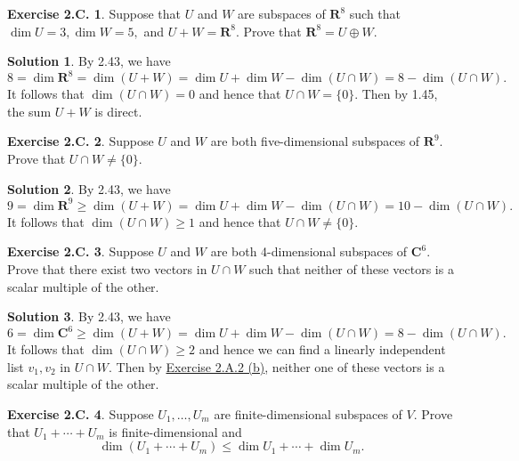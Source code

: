 \documentclass[12pt]{article}
\theoremstyle{definition}
\theoremstyle{exercise}
\newtheorem{exercise}{Exercise 2.C.}
\theoremstyle{solution}
\newtheorem*{solution}{Solution}
\newcommand{\R}{\mathbf{R}}
\newcommand{\C}{\mathbf{C}}
\begin{document}
\begin{exercise}
\label{ex:11}
    Suppose that \( U \) and \( W \) are subspaces of \( \R^8 \) such that \( \dim U = 3, \dim W = 5, \) and \( U + W = \R^8 \). Prove that \( \R^8 = U \oplus W \).
\end{exercise}

\begin{solution}
    By 2.43, we have
    \[
        8 = \dim \R^8 = \dim (U + W) = \dim U + \dim W - \dim (U \cap W) = 8 - \dim (U \cap W).
    \]
    It follows that \( \dim (U \cap W) = 0 \) and hence that \( U \cap W = \{ 0 \} \). Then by 1.45, the sum \( U + W \) is direct.
\end{solution}

\begin{exercise}
\label{ex:12}
    Suppose \( U \) and \( W \) are both five-dimensional subspaces of \( \R^9 \). Prove that \( U \cap W \neq \{ 0 \} \).
\end{exercise}

\begin{solution}
    By 2.43, we have
    \[
        9 = \dim \R^9 \geq \dim (U + W) = \dim U + \dim W - \dim (U \cap W) = 10 - \dim (U \cap W).
    \]
    It follows that \( \dim (U \cap W) \geq 1 \) and hence that \( U \cap W \neq \{ 0 \} \).
\end{solution}

\begin{exercise}
\label{ex:13}
    Suppose \( U \) and \( W \) are both 4-dimensional subspaces of \( \C^6 \). Prove that there exist two vectors in \( U \cap W \) such that neither of these vectors is a scalar multiple of the other.
\end{exercise}

\begin{solution}
    By 2.43, we have
    \[
        6 = \dim \C^6 \geq \dim (U + W) = \dim U + \dim W - \dim (U \cap W) = 8 - \dim (U \cap W).
    \]
    It follows that \( \dim (U \cap W) \geq 2 \) and hence we can find a linearly independent list \( v_1, v_2 \) in \( U \cap W \). Then by \href{https://lew98.github.io/Mathematics/LADR_Section_2_A_Exercises.pdf}{Exercise 2.A.2 (b)}, neither one of these vectors is a scalar multiple of the other.
\end{solution}

\begin{exercise}
\label{ex:14}
    Suppose \( U_1, \ldots, U_m \) are finite-dimensional subspaces of \( V \). Prove that \( U_1 + \cdots + U_m \) is finite-dimensional and
    \[
        \dim (U_1 + \cdots + U_m) \leq \dim U_1 + \cdots + \dim U_m.
    \]
\end{exercise}
\end{document}
